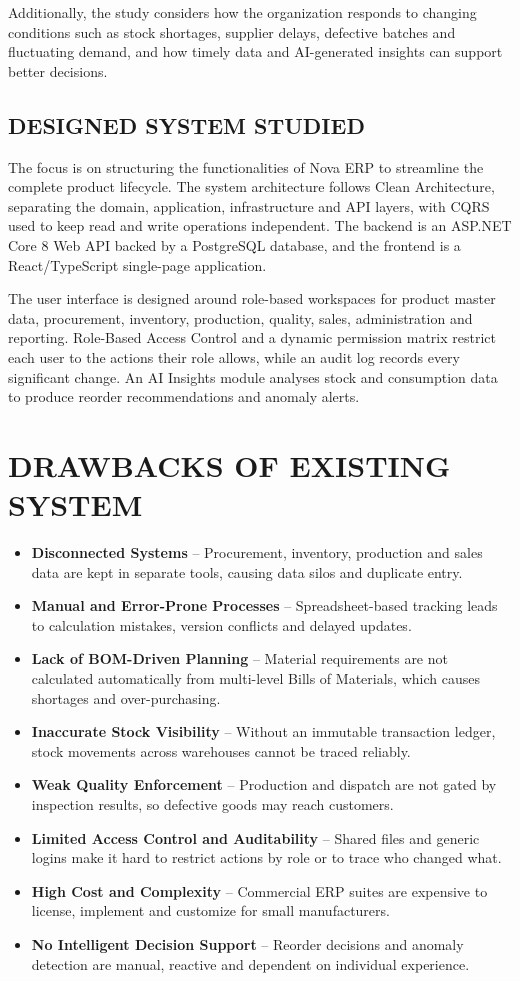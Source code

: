 \documentclass[12pt,a4paper]{report}
\begin{document}
Additionally, the study considers how the organization responds to changing conditions such as stock shortages, supplier delays, defective batches and fluctuating demand, and how timely data and AI-generated insights can support better decisions.

\subsection{DESIGNED SYSTEM STUDIED}
The focus is on structuring the functionalities of Nova ERP to streamline the complete product lifecycle. The system architecture follows Clean Architecture, separating the domain, application, infrastructure and API layers, with CQRS used to keep read and write operations independent. The backend is an ASP.NET Core 8 Web API backed by a PostgreSQL database, and the frontend is a React/TypeScript single-page application.

The user interface is designed around role-based workspaces for product master data, procurement, inventory, production, quality, sales, administration and reporting. Role-Based Access Control and a dynamic permission matrix restrict each user to the actions their role allows, while an audit log records every significant change. An AI Insights module analyses stock and consumption data to produce reorder recommendations and anomaly alerts.

\section{DRAWBACKS OF EXISTING SYSTEM}
\begin{itemize}
\item \textbf{Disconnected Systems} -- Procurement, inventory, production and sales data are kept in separate tools, causing data silos and duplicate entry.
\item \textbf{Manual and Error-Prone Processes} -- Spreadsheet-based tracking leads to calculation mistakes, version conflicts and delayed updates.
\item \textbf{Lack of BOM-Driven Planning} -- Material requirements are not calculated automatically from multi-level Bills of Materials, which causes shortages and over-purchasing.
\item \textbf{Inaccurate Stock Visibility} -- Without an immutable transaction ledger, stock movements across warehouses cannot be traced reliably.
\item \textbf{Weak Quality Enforcement} -- Production and dispatch are not gated by inspection results, so defective goods may reach customers.
\item \textbf{Limited Access Control and Auditability} -- Shared files and generic logins make it hard to restrict actions by role or to trace who changed what.
\item \textbf{High Cost and Complexity} -- Commercial ERP suites are expensive to license, implement and customize for small manufacturers.
\item \textbf{No Intelligent Decision Support} -- Reorder decisions and anomaly detection are manual, reactive and dependent on individual experience.
\end{itemize}
\end{document}
